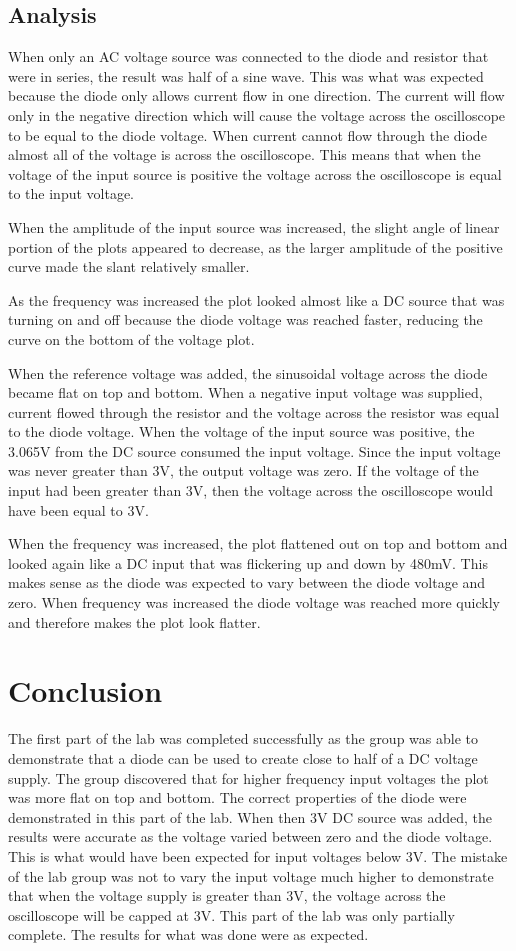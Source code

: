 \documentclass[twocolumn, amsmath]{revtex4}
\begin{document}
 
\subsection{Analysis}
When only an AC voltage source was connected to the diode and resistor that were in series, the result was half of a sine wave. This was what was expected because the diode only allows current flow in one direction. The current will flow only in the negative direction which will cause the voltage across the oscilloscope to be equal to the diode voltage. When current cannot flow through the diode almost all of the voltage is across the oscilloscope. This means that when the voltage of the input source is positive the voltage across the oscilloscope is equal to the input voltage. 

When the amplitude of the input source was increased, the slight angle of linear portion of the plots appeared to decrease, as the larger amplitude of the positive curve made the slant relatively smaller.

As the frequency was increased the plot looked almost like a DC source that was turning on and off because the diode voltage was reached faster, reducing the curve on the bottom of the voltage plot.

When the reference voltage was added, the sinusoidal voltage across the diode became flat on top and bottom. When a negative input voltage was supplied, current flowed through the resistor and the voltage across the resistor was equal to the diode voltage. When the voltage of the input source was positive, the 3.065V from the DC source consumed the input voltage. Since the input voltage was never greater than 3V, the output voltage was zero. If the voltage of the input had been greater than 3V, then the voltage across the oscilloscope would have been equal to 3V.

When the frequency was increased, the plot flattened out on top and bottom and looked again like a DC input that was flickering up and down by 480mV. This makes sense as the diode was expected to vary between the diode voltage and zero. When frequency was increased the diode voltage was reached more quickly and therefore makes the plot look flatter.



\section{Conclusion}
The first part of the lab was completed successfully as the group was able to demonstrate that a diode can be used to create close to half of a DC voltage supply. The group discovered that for higher frequency input voltages the plot was more flat on top and bottom. The correct properties of the diode were demonstrated in this part of the lab. When then 3V DC source was added, the results were accurate as the voltage varied between zero and the diode voltage. This is what would have been expected for input voltages below 3V. The mistake of the lab group was not to vary the input voltage much higher to demonstrate that when the voltage supply is greater than 3V, the voltage across the oscilloscope will be capped at 3V. This part of the lab was only partially complete. The results for what was done were as expected. 
\end{document}
